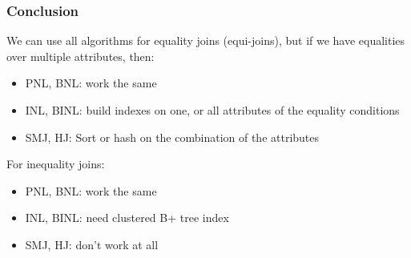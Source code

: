 \subsubsection{Conclusion}
We can use all algorithms for equality joins (equi-joins), but if we have equalities over multiple attributes, then:
\begin{itemize}
    \item PNL, BNL: work the same
    \item INL, BINL: build indexes on one, or all attributes of the equality conditions
    \item SMJ, HJ: Sort or hash on the combination of the attributes
\end{itemize}

For inequality joins:
\begin{itemize}
    \item PNL, BNL: work the same
    \item INL, BINL: need clustered B+ tree index
    \item SMJ, HJ: don't work at all
\end{itemize}

